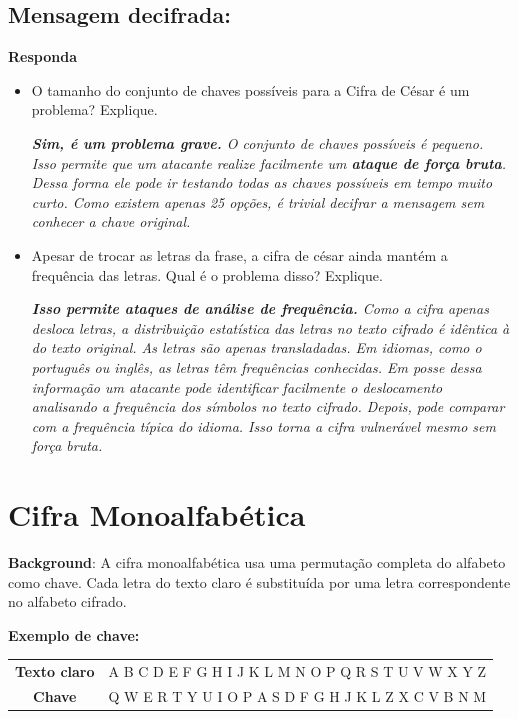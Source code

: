 \subsection*{Mensagem decifrada:}


\textbf{Responda}
\begin{itemize}
    \item O tamanho do conjunto de chaves possíveis para a Cifra de César é um problema? Explique.

          \textit{    \textbf{Sim, é um problema grave.} O conjunto de chaves possíveis é pequeno. Isso permite que um atacante realize facilmente um \textbf{ataque de força bruta}. Dessa forma ele pode ir testando todas as chaves possíveis em tempo muito curto. Como existem apenas 25 opções, é trivial decifrar a mensagem sem conhecer a chave original.}

    \item Apesar de trocar as letras da frase, a cifra de césar ainda mantém a frequência das letras. Qual é o problema disso? Explique.

          \textit{\textbf{Isso permite ataques de análise de frequência.} Como a cifra apenas desloca letras, a distribuição estatística das letras no texto cifrado é idêntica à do texto original. As letras são apenas transladadas. Em idiomas, como o português ou inglês, as letras têm frequências conhecidas. Em posse dessa informação um atacante pode identificar facilmente o deslocamento analisando a frequência dos símbolos no texto cifrado. Depois, pode comparar com a frequência típica do idioma. Isso torna a cifra vulnerável mesmo sem força bruta.}
\end{itemize}

\section{Cifra Monoalfabética}
\textbf{Background}: A cifra monoalfabética usa uma permutação completa do alfabeto como chave. Cada letra do texto claro é substituída por uma letra correspondente no alfabeto cifrado.

\textbf{Exemplo de chave:}

\begin{tabular}{c|c}
    \textbf{Texto claro} & A B C D E F G H I J K L M N O P Q R S T U V W X Y Z \\
    \textbf{Chave}       & Q W E R T Y U I O P A S D F G H J K L Z X C V B N M \\
\end{tabular}

